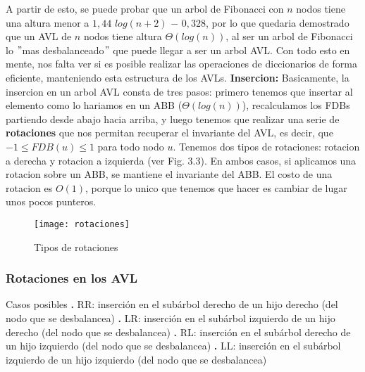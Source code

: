 \documentclass[10pt,a4paper]{article}
\begin{document}
A partir de esto, se puede probar que un arbol de Fibonacci con $n$ nodos tiene una altura menor a $1,44$ $log(n+2)$ $-$ $0,328$, por lo que quedaria demostrado que un AVL de $n$ nodos tiene altura $\Theta(log(n))$, al ser un arbol de Fibonacci lo $"$mas desbalanceado$"$ que puede llegar a ser un arbol AVL. Con todo esto en mente, nos falta ver si es posible realizar las operaciones de diccionarios de forma eficiente, manteniendo esta estructura de los AVLs.
\newline
\newline
\textbf{Insercion:} Basicamente, la insercion en un arbol AVL consta de tres pasos: primero tenemos que insertar al elemento como lo hariamos en un ABB ($\Theta(log(n))$), recalculamos los FDBs partiendo desde abajo hacia arriba, y luego tenemos que realizar una serie de \textbf{rotaciones} que nos permitan recuperar el invariante del AVL, es decir, que $-1 \leq FDB(u) \leq 1$ para todo nodo $u$.
\newline
\newline
Tenemos dos tipos de rotaciones: rotacion a derecha y rotacion a izquierda (ver Fig. 3.3). En ambos casos, si aplicamos una rotacion sobre un ABB, se mantiene el invariante del ABB. El costo de una rotacion es $O(1)$, porque lo unico que tenemos que hacer es cambiar de lugar unos pocos punteros.

\begin{figure}[h]
	\centering
	\texttt{[image: rotaciones]}
	\caption{Tipos de rotaciones}
	\label{drivers1}
\end{figure}

\newpage

\subsubsection{Rotaciones en los AVL}

Casos posibles
\newline
\newline
\textbf{.} RR: inserción en el subárbol derecho de un hijo derecho (del nodo que se desbalancea)
\newline
\newline
\textbf{.} LR: inserción en el subárbol izquierdo de un hijo derecho (del nodo que se  desbalancea)
\newline
\newline
\textbf{.} RL: inserción en el subárbol derecho de un hijo izquierdo (del nodo que se  desbalancea)
\newline
\newline
\textbf{.} LL: inserción en el subárbol izquierdo de un hijo izquierdo (del nodo que se  desbalancea)
\end{document}

